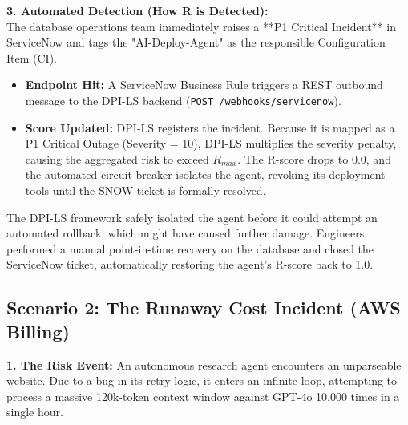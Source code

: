 \documentclass[11pt,a4paper]{article}
\begin{document}
\textbf{3. Automated Detection (How R is Detected):}\\
The database operations team immediately raises a **P1 Critical Incident** in ServiceNow and tags the "AI-Deploy-Agent" as the responsible Configuration Item (CI).

\vspace{0.3cm}
\begin{tcolorbox}[enhanced, colback=blue!5!white, colframe=dpiblue, title={\textbf{\faCogs\ 4. Integration \& Score Downgrade}}, fonttitle=\bfseries, boxrule=1pt, arc=2mm]
\begin{itemize}
    \item \textbf{Endpoint Hit:} A ServiceNow Business Rule triggers a REST outbound message to the DPI-LS backend (\texttt{POST /webhooks/servicenow}).
    \item \textbf{Score Updated:} DPI-LS registers the incident. Because it is mapped as a P1 Critical Outage (Severity = 10), DPI-LS multiplies the severity penalty, causing the aggregated risk to exceed $R_{max}$. The R-score drops to 0.0, and the automated circuit breaker isolates the agent, revoking its deployment tools until the SNOW ticket is formally resolved.
\end{itemize}
\end{tcolorbox}
\vspace{0.3cm}


\vspace{0.3cm}
\begin{tcolorbox}[enhanced, colback=green!5!white, colframe=dpigreen, title={\textbf{\faWrench\ 6. Root Cause Analysis \& Resolution}}, fonttitle=\bfseries, boxrule=1pt, arc=2mm]
The DPI-LS framework safely isolated the agent before it could attempt an automated rollback, which might have caused further damage. Engineers performed a manual point-in-time recovery on the database and closed the ServiceNow ticket, automatically restoring the agent's R-score back to 1.0.
\end{tcolorbox}
\vspace{0.3cm}

\subsection{Scenario 2: The Runaway Cost Incident (AWS Billing)}

\textbf{1. The Risk Event:} 
An autonomous research agent encounters an unparseable website. Due to a bug in its retry logic, it enters an infinite loop, attempting to process a massive 120k-token context window against GPT-4o 10,000 times in a single hour.
\end{document}
